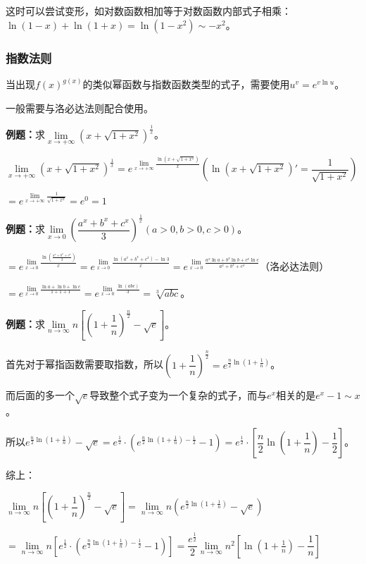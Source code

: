 \documentclass[UTF8, 12pt]{ctexart}
\begin{document}
这时可以尝试变形，如对数函数相加等于对数函数内部式子相乘：$\ln(1-x)+\ln(1+x)=\ln(1-x^2)\sim-x^2$。

\subsubsection{指数法则}

当出现$f(x)^{g(x)}$的类似幂函数与指数函数类型的式子，需要使用$u^v=e^{v\ln u}$。

一般需要与洛必达法则配合使用。

\textbf{例题：}求$\lim\limits_{x\to+\infty}(x+\sqrt{1+x^2})^{\frac{1}{x}}$。

$\lim\limits_{x\to+\infty}(x+\sqrt{1+x^2})^{\frac{1}{x}}=e^{\lim\limits_{x\to+\infty}\frac{\ln(x+\sqrt{1+x^2})}{x}} \left(\ln(x+\sqrt{1+x^2})'=\dfrac{1}{\sqrt{1+x^2}}\right)$\medskip

$=e^{\lim\limits_{x\to+\infty}\frac{1}{\sqrt{1+x^2}}}=e^0=1$

\textbf{例题：}求$\lim\limits_{x\to 0}\left(\dfrac{a^x+b^x+c^x}{3}\right)^{\frac{1}{x}}(a>0,b>0,c>0)$。\medskip

$=e^{\lim\limits_{x\to 0}\frac{\ln\left(\frac{a^x+b^x+c^x}{3}\right)}{x}}=e^{\lim\limits_{x\to 0}\frac{\ln(a^x+b^x+c^x)-\ln 3}{x}}=e^{\lim\limits_{x\to 0}\frac{a^x\ln a+b^x\ln b+c^x\ln c}{a^x+b^x+c^x}}$（洛必达法则）

$=e^{\lim\limits_{x\to 0}\frac{\ln a+\ln b+\ln c}{1+1+1}}=e^{\lim\limits_{x\to 0}\frac{\ln(abc)}{3}}=\sqrt[3]{abc}$。\medskip

\textbf{例题：}求$\lim\limits_{n\to\infty}n\left[\left(1+\dfrac{1}{n}\right)^{\frac{n}{2}}-\sqrt{e}\right]$。

首先对于幂指函数需要取指数，所以$\left(1+\dfrac{1}{n}\right)^{\frac{n}{2}}=e^{\frac{n}{2}\ln(1+\frac{1}{n})}$。\medskip

而后面的多一个$\sqrt{e}$导致整个式子变为一个复杂的式子，而与$e^x$相关的是$e^x-1\sim x$。

所以$e^{\frac{n}{2}\ln(1+\frac{1}{n})}-\sqrt{e}=e^{\frac{1}{2}}\cdot\left(e^{\frac{n}{2}\ln(1+\frac{1}{n})-\frac{1}{2}}-1\right)=e^{\frac{1}{2}}\cdot\left[\dfrac{n}{2}\ln(1+\dfrac{1}{n})-\dfrac{1}{2}\right]$。

综上：

$\lim\limits_{n\to\infty}n\left[\left(1+\dfrac{1}{n}\right)^{\frac{n}{2}}-\sqrt{e}\right]=\lim\limits_{n\to\infty}n\left(e^{\frac{n}{2}\ln(1+\frac{1}{n})}-\sqrt{e}\right)$ \medskip

$=\lim\limits_{n\to\infty}n\left[e^{\frac{1}{2}}\cdot\left(e^{\frac{n}{2}\ln(1+\frac{1}{n})-\frac{1}{2}}-1\right)\right]=\dfrac{e^{\frac{1}{2}}}{2}\lim\limits_{n\to\infty}n^2\left[\ln\left(1+\frac{1}{n}\right)-\dfrac{1}{n}\right]$
\end{document}
